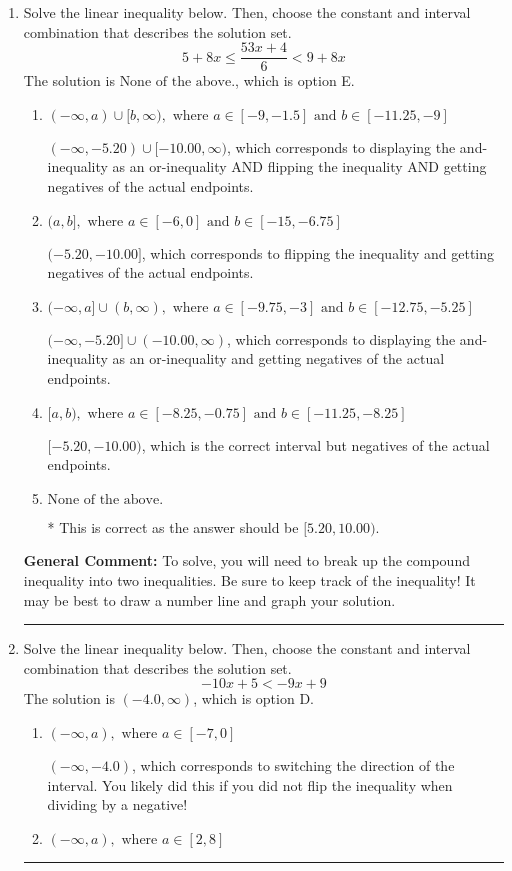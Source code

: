 \documentclass{extbook}[14pt]
\newcommand{\litem}[1]{\item #1

\rule{\textwidth}{0.4pt}}
\begin{document}
\begin{enumerate}
{\textbf{General Comment:} When thinking about this language, it helps to draw a number line and try points.
}
\litem{
Solve the linear inequality below. Then, choose the constant and interval combination that describes the solution set.
\[ 5 + 8 x \leq \frac{53 x + 4}{6} < 9 + 8 x \]The solution is \( \text{None of the above.} \), which is option E.\begin{enumerate}[label=\Alph*.]
\item \( (-\infty, a) \cup [b, \infty), \text{ where } a \in [-9, -1.5] \text{ and } b \in [-11.25, -9] \)

$(-\infty, -5.20) \cup [-10.00, \infty)$, which corresponds to displaying the and-inequality as an or-inequality AND flipping the inequality AND getting negatives of the actual endpoints.
\item \( (a, b], \text{ where } a \in [-6, 0] \text{ and } b \in [-15, -6.75] \)

$(-5.20, -10.00]$, which corresponds to flipping the inequality and getting negatives of the actual endpoints.
\item \( (-\infty, a] \cup (b, \infty), \text{ where } a \in [-9.75, -3] \text{ and } b \in [-12.75, -5.25] \)

$(-\infty, -5.20] \cup (-10.00, \infty)$, which corresponds to displaying the and-inequality as an or-inequality and getting negatives of the actual endpoints.
\item \( [a, b), \text{ where } a \in [-8.25, -0.75] \text{ and } b \in [-11.25, -8.25] \)

$[-5.20, -10.00)$, which is the correct interval but negatives of the actual endpoints.
\item \( \text{None of the above.} \)

* This is correct as the answer should be $[5.20, 10.00)$.
\end{enumerate}

\textbf{General Comment:} To solve, you will need to break up the compound inequality into two inequalities. Be sure to keep track of the inequality! It may be best to draw a number line and graph your solution.
}
\litem{
Solve the linear inequality below. Then, choose the constant and interval combination that describes the solution set.
\[ -10x + 5 < -9x + 9 \]The solution is \( (-4.0, \infty) \), which is option D.\begin{enumerate}[label=\Alph*.]
\item \( (-\infty, a), \text{ where } a \in [-7, 0] \)

 $(-\infty, -4.0)$, which corresponds to switching the direction of the interval. You likely did this if you did not flip the inequality when dividing by a negative!
\item \( (-\infty, a), \text{ where } a \in [2, 8] \)


\end{enumerate}}
\end{enumerate}
\end{document}
